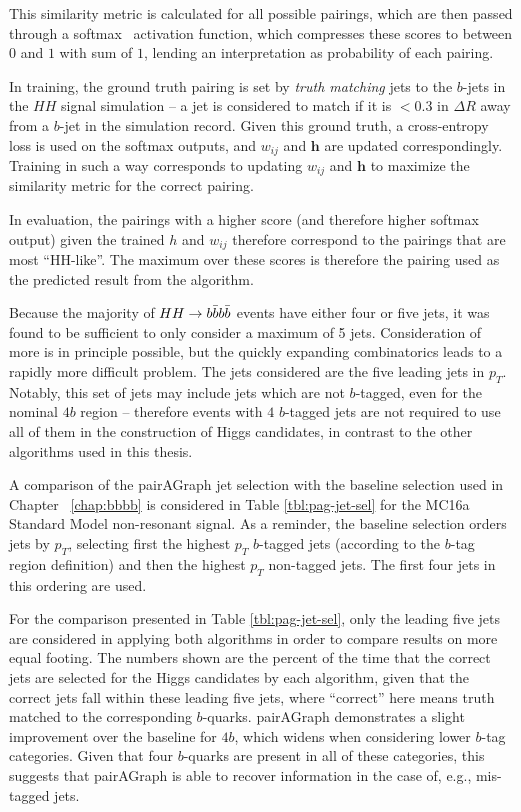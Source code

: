 This similarity metric is calculated for all possible pairings, which are then passed through a 
softmax~\cite{Softmax} activation function, which compresses these scores to between $0$ and $1$ 
with sum of $1$, lending an interpretation as probability of each pairing.

In training, the ground truth pairing is set by \emph{truth matching} jets to the $b$-jets 
in the $HH$ signal simulation -- a jet is considered to match if it is $< 0.3$ in $\Delta R$
away from a $b$-jet in the simulation record. Given this ground truth, a cross-entropy loss 
is used on the softmax outputs, and $w_{ij}$ and $\mathbf{h}$ are updated correspondingly.
Training in such a way corresponds to updating $w_{ij}$ and $\mathbf{h}$ to maximize the similarity 
metric for the correct pairing.

In evaluation, the pairings with a higher score (and therefore higher softmax output) given 
the trained $h$ and $w_{ij}$ therefore correspond to the pairings that are most ``HH-like''. 
The maximum over these scores is therefore the pairing used as the predicted result from 
the algorithm.

Because the majority of $HH\rightarrow b\bar{b}b\bar{b}$ events have either four or five jets, it was 
found to be sufficient to only consider a maximum of 5 jets. Consideration of more is in 
principle possible, but the quickly expanding combinatorics leads to a rapidly more 
difficult problem. The jets considered are the five leading jets in $p_{T}$. Notably, 
this set of jets may include jets which are not $b$-tagged, even for the nominal $4b$ 
region -- therefore events with $4$ $b$-tagged jets are not required to use all of them 
in the construction of Higgs candidates, in contrast to the other algorithms used in this 
thesis.

A comparison of the pairAGraph jet selection with the baseline selection used in Chapter ~\ref{chap:bbbb} 
is considered in Table \ref{tbl:pag-jet-sel} for the MC16a Standard Model non-resonant signal. As a reminder, 
the baseline selection orders jets by $p_{T}$, selecting first the highest $p_{T}$ $b$-tagged jets (according 
to the $b$-tag region definition) and then the highest $p_{T}$ non-tagged jets. The first four jets 
in this ordering are used. 

For the comparison presented in Table \ref{tbl:pag-jet-sel}, only the leading five jets are considered in 
applying both algorithms in order to compare results on more equal footing. The numbers shown are the percent 
of the time that the correct jets are selected for the Higgs candidates by each algorithm, given that the 
correct jets fall within these leading five jets, where ``correct'' here means truth matched to the 
corresponding $b$-quarks. pairAGraph demonstrates a slight improvement over the baseline for $4b$, which widens when 
considering lower $b$-tag categories. Given that four $b$-quarks are present in all of these 
categories, this suggests that pairAGraph is able to recover information in the case of, e.g., mis-tagged 
jets.


